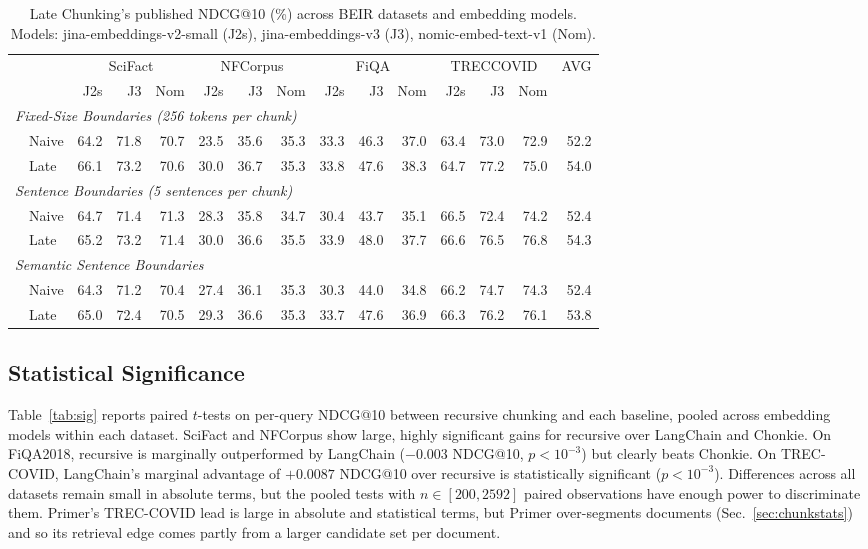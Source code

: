 \documentclass[conference]{IEEEtran}
\begin{document}
\begin{table}[!t]
\caption{Late Chunking's published NDCG@10 (\%) across BEIR datasets and embedding models. Models: jina-embeddings-v2-small (J2s), jina-embeddings-v3 (J3), nomic-embed-text-v1 (Nom).}
\label{tab:late}
\centering
\setlength{\tabcolsep}{3.5pt}
\begin{tabular}{llrrrrrrrrrrrrr}
\toprule
& & \multicolumn{3}{c}{SciFact} & \multicolumn{3}{c}{NFCorpus} & \multicolumn{3}{c}{FiQA} & \multicolumn{3}{c}{TRECCOVID} & AVG\\
\cmidrule(lr){3-5}\cmidrule(lr){6-8}\cmidrule(lr){9-11}\cmidrule(lr){12-14}
& & J2s & J3 & Nom & J2s & J3 & Nom & J2s & J3 & Nom & J2s & J3 & Nom & \\
\midrule
\multicolumn{15}{l}{\emph{Fixed-Size Boundaries (256 tokens per chunk)}}\\
& Naive & 64.2 & 71.8 & 70.7 & 23.5 & 35.6 & 35.3 & 33.3 & 46.3 & 37.0 & 63.4 & 73.0 & 72.9 & 52.2\\
& Late  & 66.1 & 73.2 & 70.6 & 30.0 & 36.7 & 35.3 & 33.8 & 47.6 & 38.3 & 64.7 & 77.2 & 75.0 & 54.0\\
\multicolumn{15}{l}{\emph{Sentence Boundaries (5 sentences per chunk)}}\\
& Naive & 64.7 & 71.4 & 71.3 & 28.3 & 35.8 & 34.7 & 30.4 & 43.7 & 35.1 & 66.5 & 72.4 & 74.2 & 52.4\\
& Late  & 65.2 & 73.2 & 71.4 & 30.0 & 36.6 & 35.5 & 33.9 & 48.0 & 37.7 & 66.6 & 76.5 & 76.8 & 54.3\\
\multicolumn{15}{l}{\emph{Semantic Sentence Boundaries}}\\
& Naive & 64.3 & 71.2 & 70.4 & 27.4 & 36.1 & 35.3 & 30.3 & 44.0 & 34.8 & 66.2 & 74.7 & 74.3 & 52.4\\
& Late  & 65.0 & 72.4 & 70.5 & 29.3 & 36.6 & 35.3 & 33.7 & 47.6 & 36.9 & 66.3 & 76.2 & 76.1 & 53.8\\
\bottomrule
\end{tabular}
\end{table}

\subsection{Statistical Significance}

Table~\ref{tab:sig} reports paired $t$-tests on per-query NDCG@10 between
recursive chunking and each baseline, pooled across embedding models within
each dataset. SciFact and NFCorpus show large, highly significant gains
for recursive over LangChain and Chonkie. On FiQA2018, recursive is
marginally outperformed by LangChain ($-0.003$ NDCG@10, $p < 10^{-3}$) but
clearly beats Chonkie. On TREC-COVID, LangChain's marginal advantage of
$+0.0087$ NDCG@10 over recursive is statistically significant
($p < 10^{-3}$). Differences across all datasets remain small in absolute
terms, but the pooled tests with $n \in [200, 2592]$ paired observations
have enough power to discriminate them. Primer's TREC-COVID lead is large
in absolute and statistical terms, but Primer over-segments documents
(Sec.~\ref{sec:chunkstats}) and so its retrieval edge comes partly from a
larger candidate set per document.
\end{document}

